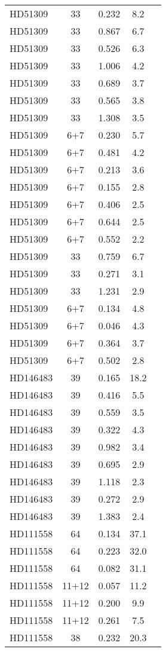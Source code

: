 \begin{table*}
\begin{tabular}{l c c c c}
HD51309 & 33 & 0.232 & 8.2\\ 
HD51309 & 33 & 0.867 & 6.7\\ 
HD51309 & 33 & 0.526 & 6.3\\ 
HD51309 & 33 & 1.006 & 4.2\\ 
HD51309 & 33 & 0.689 & 3.7\\ 
HD51309 & 33 & 0.565 & 3.8\\ 
HD51309 & 33 & 1.308 & 3.5\\ 
HD51309 & 6+7 & 0.230 & 5.7\\ 
HD51309 & 6+7 & 0.481 & 4.2\\ 
HD51309 & 6+7 & 0.213 & 3.6\\ 
HD51309 & 6+7 & 0.155 & 2.8\\ 
HD51309 & 6+7 & 0.406 & 2.5\\ 
HD51309 & 6+7 & 0.644 & 2.5\\ 
HD51309 & 6+7 & 0.552 & 2.2\\ 
HD51309 & 33 & 0.759 & 6.7\\ 
HD51309 & 33 & 0.271 & 3.1\\ 
HD51309 & 33 & 1.231 & 2.9\\ 
HD51309 & 6+7 & 0.134 & 4.8\\ 
HD51309 & 6+7 & 0.046 & 4.3\\ 
HD51309 & 6+7 & 0.364 & 3.7\\ 
HD51309 & 6+7 & 0.502 & 2.8\\ 
\hline
HD146483 & 39 & 0.165 & 18.2\\ 
HD146483 & 39 & 0.416 & 5.5\\ 
HD146483 & 39 & 0.559 & 3.5\\ 
HD146483 & 39 & 0.322 & 4.3\\ 
HD146483 & 39 & 0.982 & 3.4\\ 
HD146483 & 39 & 0.695 & 2.9\\ 
HD146483 & 39 & 1.118 & 2.3\\ 
HD146483 & 39 & 0.272 & 2.9\\ 
HD146483 & 39 & 1.383 & 2.4\\ 
\hline
HD111558 & 64 & 0.134 & 37.1\\ 
HD111558 & 64 & 0.223 & 32.0\\ 
HD111558 & 64 & 0.082 & 31.1\\ 
HD111558 & 11+12 & 0.057 & 11.2\\ 
HD111558 & 11+12 & 0.200 & 9.9\\ 
HD111558 & 11+12 & 0.261 & 7.5\\ 
HD111558 & 38 & 0.232 & 20.3\\ 

\end{tabular}
\end{table*}
